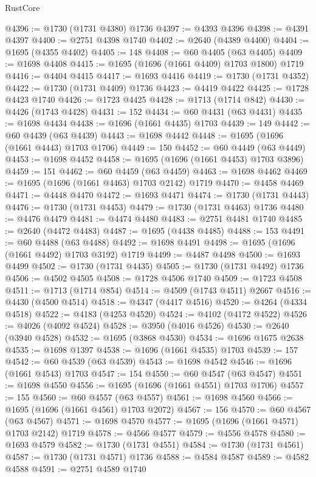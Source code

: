 \begin{lexlean}{RustCore}
\begin{coremodule}
@4396 := @1730 (@1731 @4380) @1736
@4397 := @4393 @4396
@4398 := @4391 @4397
@4400 := @2751 @4398 @1740
@4402 := @2640 (@4389 @4400)
@4404 := @1695 (@4355 @4402)
@4405 := 148
@4408 := @60 @4405 (@63 @4405)
@4409 := @1698 @4408
@4415 := @1695 (@1696 (@1661 @4409) @1703 @1800) @1719
@4416 := @4404 @4415
@4417 := @1693 @4416
@4419 := @1730 (@1731 @4352)
@4422 := @1730 (@1731 @4409) @1736
@4423 := @4419 @4422
@4425 := @1728 @4423 @1740
@4426 := @1723 @4425
@4428 := @1713 (@1714 @842)
@4430 := @4426 (@1743 @4428)
@4431 := 152
@4434 := @60 @4431 (@63 @4431)
@4435 := @1698 @4434
@4438 := @1696 (@1661 @4435) @1703
@4439 := 149
@4442 := @60 @4439 (@63 @4439)
@4443 := @1698 @4442
@4448 := @1695 (@1696 (@1661 @4443) @1703 @1706)
@4449 := 150
@4452 := @60 @4449 (@63 @4449)
@4453 := @1698 @4452
@4458 := @1695 (@1696 (@1661 @4453) @1703 @3896)
@4459 := 151
@4462 := @60 @4459 (@63 @4459)
@4463 := @1698 @4462
@4469 := @1695 (@1696 (@1661 @4463) @1703 @2142) @1719
@4470 := @4458 @4469
@4471 := @4448 @4470
@4472 := @1693 @4471
@4474 := @1730 (@1731 @4443)
@4476 := @1730 (@1731 @4453)
@4479 := @1730 (@1731 @4463) @1736
@4480 := @4476 @4479
@4481 := @4474 @4480
@4483 := @2751 @4481 @1740
@4485 := @2640 (@4472 @4483)
@4487 := @1695 (@4438 @4485)
@4488 := 153
@4491 := @60 @4488 (@63 @4488)
@4492 := @1698 @4491
@4498 := @1695 (@1696 (@1661 @4492) @1703 @3192) @1719
@4499 := @4487 @4498
@4500 := @1693 @4499
@4502 := @1730 (@1731 @4435)
@4505 := @1730 (@1731 @4492) @1736
@4506 := @4502 @4505
@4508 := @1728 @4506 @1740
@4509 := @1723 @4508
@4511 := @1713 (@1714 @854)
@4514 := @4509 (@1743 @4511) @2667
@4516 := @4430 (@4500 @4514)
@4518 := @4347 (@4417 @4516)
@4520 := @4264 (@4334 @4518)
@4522 := @4183 (@4253 @4520)
@4524 := @4102 (@4172 @4522)
@4526 := @4026 (@4092 @4524)
@4528 := @3950 (@4016 @4526)
@4530 := @2640 (@3940 @4528)
@4532 := @1695 (@3868 @4530)
@4534 := @1696 @1675 @2638
@4535 := @1698 @1397
@4538 := @1696 (@1661 @4535) @1703
@4539 := 157
@4542 := @60 @4539 (@63 @4539)
@4543 := @1698 @4542
@4546 := @1696 (@1661 @4543) @1703
@4547 := 154
@4550 := @60 @4547 (@63 @4547)
@4551 := @1698 @4550
@4556 := @1695 (@1696 (@1661 @4551) @1703 @1706)
@4557 := 155
@4560 := @60 @4557 (@63 @4557)
@4561 := @1698 @4560
@4566 := @1695 (@1696 (@1661 @4561) @1703 @2072)
@4567 := 156
@4570 := @60 @4567 (@63 @4567)
@4571 := @1698 @4570
@4577 := @1695 (@1696 (@1661 @4571) @1703 @2142) @1719
@4578 := @4566 @4577
@4579 := @4556 @4578
@4580 := @1693 @4579
@4582 := @1730 (@1731 @4551)
@4584 := @1730 (@1731 @4561)
@4587 := @1730 (@1731 @4571) @1736
@4588 := @4584 @4587
@4589 := @4582 @4588
@4591 := @2751 @4589 @1740

\end{coremodule}
\end{lexlean}

